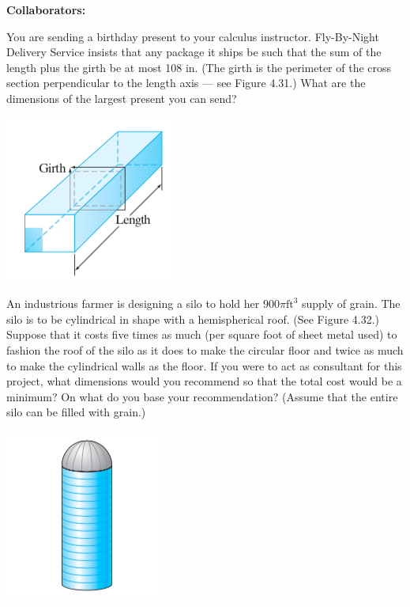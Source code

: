 \documentclass[11pt,letterpaper,boxed]{hmcpset}
\begin{document}
\noindent\textbf{Collaborators:} 


\begin{problem}[Colley 4.3 \#24]
You are sending a birthday present to your calculus instructor. Fly-By-Night Delivery Service insists that any package it ships be such that the sum of the length plus the girth be at most 108 in. (The girth is the perimeter of the cross section perpendicular to the length axis --- see Figure 4.31.) What are the dimensions of the largest present you can send?
\begin{center}
\includegraphics[scale=0.5]{prob1.png}
\end{center}
\end{problem}

\begin{solution}
\vfill
\end{solution}
\newpage

\begin{problem}[Colley 4.3 \#26]
An industrious farmer is designing a silo to hold her
$900\pi \text{ft}^3$ supply of grain. The silo is to be cylindrical in shape with a hemispherical roof. (See Figure 4.32.) Suppose that it costs five times as much (per square foot of sheet metal used) to fashion the roof of the silo as it does to make the circular floor and twice as much to make the cylindrical walls as the floor. If you were to act as consultant for this project, what dimensions would you recommend so that the total cost would be a minimum? On what do you base your recommendation? (Assume that the entire silo can be filled with grain.)
\begin{center}
\includegraphics[scale=0.5]{prob2.png}
\end{center}
\end{problem}
\end{document}
